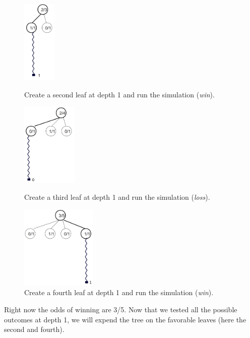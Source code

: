 \begin{figure}[H]
\centering
	\begin{minipage}[b]{0.3\linewidth}
		\centering
		\includegraphics[height=4cm]{1_Presentation/1.2_Algorithm_MCTS_Benoit/img/3.png}
		\caption{\label{fig:3}Create a second leaf at depth 1 and run the simulation (\textit{win}).}
	\end{minipage}%
	\hspace*{1cm}
	\begin{minipage}[b]{0.3\linewidth}
		\centering
		\includegraphics[height=4cm]{1_Presentation/1.2_Algorithm_MCTS_Benoit/img/4.png}
		\caption{\label{fig:4}Create a third leaf at depth 1 and run the simulation (\textit{loss}).}
	\end{minipage}%
	\hspace*{1cm}
	\begin{minipage}[b]{0.3\linewidth}
		\centering
		\includegraphics[height=4cm]{1_Presentation/1.2_Algorithm_MCTS_Benoit/img/5.png}
		\caption{\label{fig:5}Create a fourth leaf at depth 1 and run the simulation (\textit{win}).}
	\end{minipage}%
\end{figure}

\noindent
Right now the odds of winning are 3/5. Now that we tested all the possible outcomes at depth 1, we will expend the tree on the favorable leaves (here the second and fourth).

